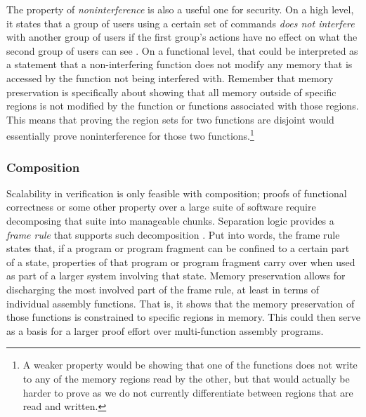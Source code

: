 The property of \emph{noninterference} is also a useful one for security.
On a high level, it states that a group of users using a certain set of commands \emph{does not interfere} with another group of users if the first group's actions have no effect on what the second group of users can see
\autocite{goguen1982security,rushby1992noninterference}.
On a functional level, that could be interpreted as a statement that a non-interfering function does not modify any memory that is accessed by the function not being interfered with.
Remember that memory preservation is specifically about showing that all memory outside of specific regions is not modified by the function or functions associated with those regions.
This means that proving the region sets for two functions are disjoint would essentially prove noninterference for those two functions.\footnote{%
  A weaker property would be showing that one of the functions does not write
  to any of the memory regions read by the other, but that would actually be harder to prove as we do not currently differentiate between regions that are read and written.%
}

\subsubsection{Composition}\label{sse:composition}
Scalability in verification is only feasible with composition; proofs of functional correctness or some other property over a large suite of software require decomposing that suite into manageable chunks.
Separation logic provides a \emph{frame rule} that supports such%
decomposition \autocite{o2001local,reynolds2002separation,krebbers2017essence}.
Put into words, the frame rule states that,
if a program or program fragment can be confined to a certain part of a state, properties of that program or program fragment carry over when used as part of a larger system involving that state.
Memory preservation allows for discharging the most involved part of the frame rule, at least in terms of individual assembly functions.
That is, it shows that the memory preservation of those functions is constrained to specific regions in memory.
This could then serve as a basis for a larger proof effort over multi-function assembly programs.

